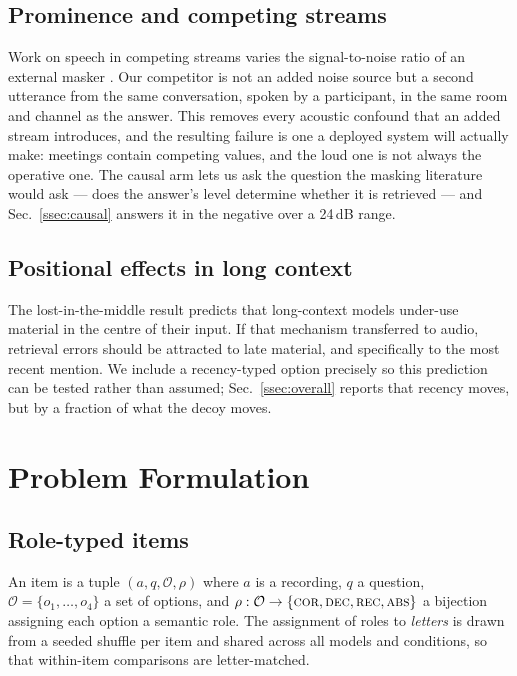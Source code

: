 \documentclass{article}
\begin{document}
\subsection{Prominence and competing streams}
Work on speech in competing streams varies the signal-to-noise ratio of an
external masker \cite{cherry,bregman}. Our competitor is not an added noise
source but a second utterance from the same conversation, spoken by a
participant, in the same room and channel as the answer. This removes every
acoustic confound that an added stream introduces, and the resulting failure
is one a deployed system will actually make: meetings contain competing
values, and the loud one is not always the operative one. The causal arm
lets us ask the question the masking literature would ask --- does the
answer's level determine whether it is retrieved --- and Sec.~\ref{ssec:causal}
answers it in the negative over a 24\,dB range.

\subsection{Positional effects in long context}
The lost-in-the-middle result \cite{lostmiddle} predicts that long-context
models under-use material in the centre of their input. If that mechanism
transferred to audio, retrieval errors should be attracted to late material,
and specifically to the most recent mention. We include a recency-typed
option precisely so this prediction can be tested rather than assumed;
Sec.~\ref{ssec:overall} reports that recency moves, but by a fraction of
what the decoy moves.

\section{Problem Formulation}
\label{sec:problem}

\subsection{Role-typed items}
An item is a tuple $(a, q, \mathcal{O}, \rho)$ where $a$ is a recording, $q$
a question, $\mathcal{O}=\{o_1,\dots,o_4\}$ a set of options, and
$\rho:\mathcal{O}\rightarrow\{\textsc{cor},\textsc{dec},\textsc{rec},
\textsc{abs}\}$ a bijection assigning each option a semantic role. The
assignment of roles to \emph{letters} is drawn from a seeded shuffle per item
and shared across all models and conditions, so that within-item comparisons
are letter-matched.
\end{document}
